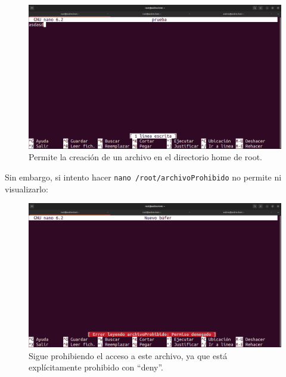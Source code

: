 \documentclass{article}
\begin{document}
\begin{figure}[H]
    \centering
    \includegraphics[width=\textwidth]{imagenes/Captura desde 2022-10-18 17-26-43.png}
    \caption{Permite la creación de un archivo en el directorio home de root.}
\end{figure}

\bigskip

Sin embargo, si intento hacer \verb|nano /root/archivoProhibido| no permite ni visualizarlo:

\begin{figure}[H]
    \centering
    \includegraphics[width=\textwidth]{imagenes/Captura desde 2022-10-18 17-26-52.png}
    \caption{Sigue prohibiendo el acceso a este archivo, ya que está explícitamente prohibido con ``deny''.}
\end{figure}
\end{document}
